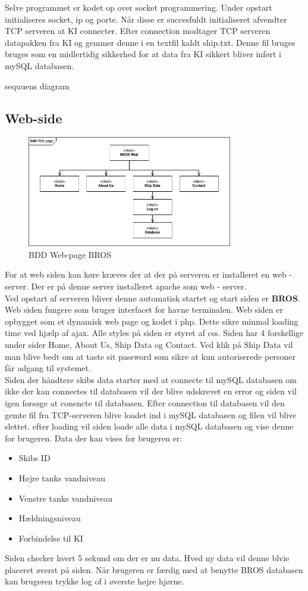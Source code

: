Selve programmet er kodet op over socket programmering. Under opstart initialiseres socket, ip og porte. Når disse er succesfuldt initialiseret afvendter TCP serveren at KI connecter. Efter connection modtager TCP serveren datapakken fra KI og gemmer denne i en textfil kaldt ship.txt. Denne fil bruges bruges som en midlertidig sikkerhed for at data fra KI sikkert bliver inført i mySQL databasen.

sequuens diagram

\subsection{Web-side}
\begin{figure}[htbp]
	\centering
	\includegraphics[width=0.8\textwidth]{billeder/bdd_web}
	\caption{BDD Web-page BROS}
	\label{fig:bdd_web}
\end{figure}

For at web siden kan køre kræves der at der på serveren er installeret en web - server. Der er på denne server installeret apache som web - server.\\
Ved opstart af serveren bliver denne automatisk startet og start siden er \textbf{BROS}. Web siden fungere som bruger interfacet for havne terminalen. Web siden er opbygget som et dynamisk web page og kodet i php. Dette sikre minmal loading time ved hjælp af ajax. Alle styles på siden er styret af css. Siden har 4 forskellige under sider Home, About Us, Ship Data og Contact. Ved klik på Ship Data vil man blive bedt om at taste sit password som sikre at kun autoriserede personer får adgang til systemet.\\
Siden der håndtere skibs data starter med at connecte til mySQL databasen om ikke der kan connectes til databasen vil der blive udskrevet en error og siden vil igen forsøge at conencte til databasen. Efter connection til databasen vil den gemte fil fra TCP-serveren blive loadet ind i mySQL databasen og filen vil blive slettet. efter loading vil siden loade alle data i mySQL databasen og vise denne for brugeren. Data der kan vises for brugeren er:
\begin{itemize}
	\item Skibs ID
	\item Højre tanks vandniveau
	\item Venstre tanks vandniveau
	\item Hældningsniveau
	\item Forbindelse til KI
\end{itemize}
Siden checker hvert 5 sekund om der er nu data. Hved ny data vil denne blvie placeret øverst på siden.
Når brugeren er færdig med at benytte BROS databasen kan brugeren trykke log of i øverste højre hjørne.

